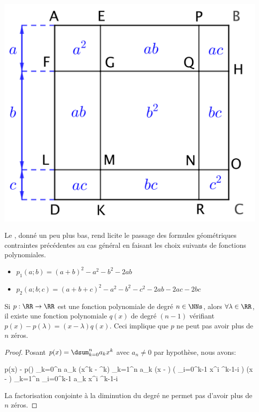 \begin{center}
	\includegraphics[scale = .7]{(a+b+c)^2.png}
\end{center}

Le , donné un peu plus bas, rend licite le passage des formules géométriques contraintes précédentes au cas général en faisant les choix suivants de fonctions polynomiales.
%
\begin{itemize}[label=\small\textbullet]
	\item $p_1(a ; b) = (a + b)^2 - a^2 - b^2 - 2 ab$

	\item $p_2(a ; b ; c) = (a + b + c)^2 - a^2 - b^2 - c^2 - 2 ab - 2 ac - 2 bc$
\end{itemize}




\begin{preli} \label{poly-finite-zeros}
	Si $p: \RR \rightarrow \RR$ est une fonction polynomiale de degré $n \in \NNs$,
	alors $\forall \lambda \in \RR$,
	il existe une fonction polynomiale $q(x)$ de degré $(n-1)$ vérifiant
	$p(x) - p(\lambda) = (x - \lambda) q(x)$.
	Ceci implique que $p$ ne peut pas avoir plus de $n$ zéros.
\end{preli}


\begin{proof}
	Posant $p(x) = \dsum_{k=0}^{n} a_k x^k$ avec $a_n \neq 0$ par hypothèse, nous avons:
	
	\begin{stepcalc}[style=sar]
	    p(x) - p(\lambda)
	\explnext{}
	    \dsum_{k=0}^{n} a_k (x^k - \lambda^k)
	\explnext{}
	    \dsum_{k=1}^{n} a_k (x - \lambda) \big( \dsum_{i=0}^{k-1} x^i \lambda^{k-1-i} \big)
	\explnext{}
	    (x - \lambda) \dsum_{k=1}^{n} \dsum_{i=0}^{k-1} a_k x^i \lambda^{k-1-i} 
	\end{stepcalc}
	
	La factorisation conjointe à la diminution du degré ne permet pas d'avoir plus de $n$ zéros. 
\end{proof}



